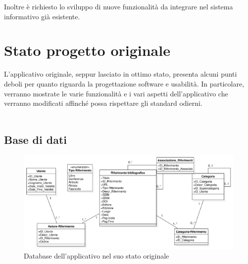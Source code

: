 Inoltre è richiesto lo sviluppo di nuove funzionalità da integrare nel sistema informativo già esistente.
\newpage
\raggedright{\section{Stato progetto originale}}
L'applicativo originale, seppur lasciato in ottimo stato, presenta alcuni punti deboli per quanto riguarda la progettazione software e usabilità. In particolare, verranno mostrate le varie funzionalità e i vari aspetti dell'applicativo che verranno modificati affinché possa rispettare gli standard odierni.
\\~\\
\raggedright{{\subsection{Base di dati}}}

\begin{figure}[H]
    \centering
    \includegraphics[width=.90\textwidth]{Immagini/VecchioProgetto/UML Basi di Dati pre ristrutturato.png} 
    \caption{Database dell'applicativo nel suo stato originale}
\end{figure}
        
